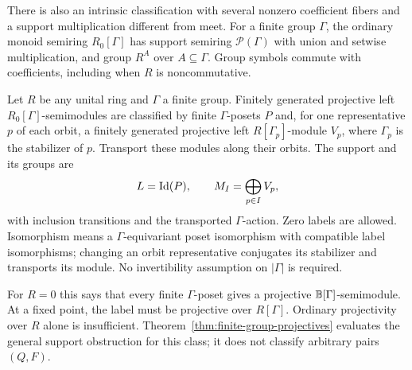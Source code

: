 
There is also an intrinsic classification with several nonzero coefficient
fibers and a support multiplication different from meet. For a finite group
$\Gamma$, the ordinary monoid semiring $R_0[\Gamma]$ has support semiring
$\mathcal P(\Gamma)$ with union and setwise multiplication, and group $R^A$
over $A\subseteq\Gamma$. Group symbols commute with coefficients, including
when $R$ is noncommutative.

\begin{theorem}
\label{thm:finite-group-projectives}
Let $R$ be any unital ring and $\Gamma$ a finite group. Finitely generated
projective left $R_0[\Gamma]$-semimodules are classified by finite
$\Gamma$-posets $P$ and, for one representative $p$ of each orbit, a
finitely generated projective left $R[\Gamma_p]$-module $V_p$, where
$\Gamma_p$ is the stabilizer of $p$. Transport these modules along their
orbits. The support and its groups are
\[
 L=\operatorname{Id}(P),\qquad M_I=\bigoplus_{p\in I}V_p,
\]
with inclusion transitions and the transported $\Gamma$-action. Zero
labels are allowed. Isomorphism means a $\Gamma$-equivariant poset
isomorphism with compatible label isomorphisms; changing an orbit
representative conjugates its stabilizer and transports its module.
No invertibility assumption on $|\Gamma|$ is required.
\end{theorem}

For $R=0$ this says that every finite $\Gamma$-poset gives a projective
$\mathbb B[\Gamma]$-semimodule. At a fixed point, the label must be projective
over $R[\Gamma]$. Ordinary projectivity over $R$ alone is insufficient.
Theorem~\ref{thm:finite-group-projectives} evaluates the general support
obstruction for this class; it does not classify arbitrary pairs $(Q,F)$.
